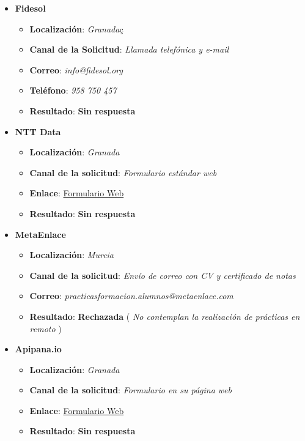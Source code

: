 \begin{itemize}
	\item {\large \textbf{Fidesol}}
	\begin{itemize}
		\item \textbf{Localización}: \textit{Granada}ç
		\item \textbf{Canal de la Solicitud}: \textit{Llamada telefónica y e-mail}
		\item \textbf{Correo}: \textit{info@fidesol.org}
		\item \textbf{Teléfono}: \textit{958 750 457}
		\item \textbf{Resultado}: {\color{orange} \textbf{Sin respuesta}}
	\end{itemize}
	\item {\large\textbf{NTT Data}}
		\begin{itemize}
		\item \textbf{Localización}: \textit{Granada}
		\item \textbf{Canal de la solicitud}: \textit{Formulario estándar web}
		\item \textbf{Enlace}:  \href{https://careers.emeal.nttdata.com/s/offer/a1J2p000009xQ65EAE/pr%C3%A1cticas-ntt-data?language=es}{Formulario Web}
		\item \textbf{Resultado}: {\color{orange} \textbf{Sin respuesta}}
	\end{itemize}
		\item {\large\textbf{MetaEnlace}}
	\begin{itemize}
		\item \textbf{Localización}: \textit{Murcia}
		\item \textbf{Canal de la solicitud}: \textit{Envío de correo con CV y certificado de notas}
		\item \textbf{Correo}: \textit{practicasformacion.alumnos@metaenlace.com}
		\item \textbf{Resultado}: {\color{red}\textbf{Rechazada}}  (\textit{ No contemplan la realización de prácticas en remoto} )
	\end{itemize}
		\item \textbf{Apipana.io}
		\begin{itemize}
		\item \textbf{Localización}: \textit{Granada}
		\item \textbf{Canal de la solicitud}: \textit{Formulario en su página web}
		\item \textbf{Enlace}: \href{https://apipana.io/granada/#form}{Formulario Web}
		\item \textbf{Resultado}: {\color{orange} \textbf{Sin respuesta}}

\end{itemize}
\end{itemize}

